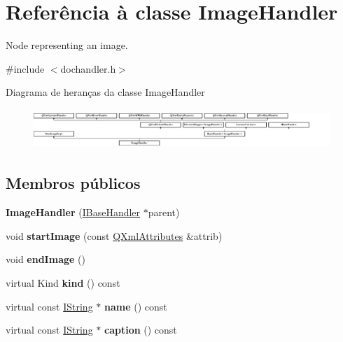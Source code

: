 \hypertarget{class_image_handler}{\section{Referência à classe Image\-Handler}
\label{class_image_handler}
}


Node representing an image.  




{\ttfamily \#include $<$dochandler.\-h$>$}

Diagrama de heranças da classe Image\-Handler\begin{figure}[H]
\begin{center}
\leavevmode
\includegraphics[height=1.523810cm]{class_image_handler}
\end{center}
\end{figure}
\subsection*{Membros públicos}
\begin{DoxyCompactItemize}
\item 
\hypertarget{class_image_handler_a2e0dbef6bfbd45fdcf0fcf6c2a46ea54}{{\bfseries Image\-Handler} (\hyperlink{class_i_base_handler}{I\-Base\-Handler} $\ast$parent)}\label{class_image_handler_a2e0dbef6bfbd45fdcf0fcf6c2a46ea54}

\item 
\hypertarget{class_image_handler_a56db971619d18aec03a3ac9e5554b271}{void {\bfseries start\-Image} (const \hyperlink{class_q_xml_attributes}{Q\-Xml\-Attributes} \&attrib)}\label{class_image_handler_a56db971619d18aec03a3ac9e5554b271}

\item 
\hypertarget{class_image_handler_ab2bcf675cff0d1a62d6a9232e83060ad}{void {\bfseries end\-Image} ()}\label{class_image_handler_ab2bcf675cff0d1a62d6a9232e83060ad}

\item 
\hypertarget{class_image_handler_af8e62c8a81ddf2283205cc8955de50eb}{virtual Kind {\bfseries kind} () const }\label{class_image_handler_af8e62c8a81ddf2283205cc8955de50eb}

\item 
\hypertarget{class_image_handler_a61b3e127d271cd613cc928e35f60125e}{virtual const \hyperlink{class_i_string}{I\-String} $\ast$ {\bfseries name} () const }\label{class_image_handler_a61b3e127d271cd613cc928e35f60125e}

\item 
\hypertarget{class_image_handler_a044136005e1897ffcdd89f6c73c25c80}{virtual const \hyperlink{class_i_string}{I\-String} $\ast$ {\bfseries caption} () const }\label{class_image_handler_a044136005e1897ffcdd89f6c73c25c80}

\end{DoxyCompactItemize}
